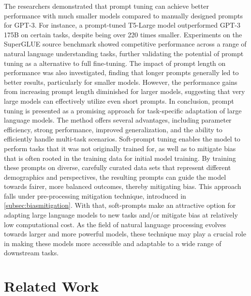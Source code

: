 The researchers demonstrated that prompt tuning can achieve better performance with much smaller models compared to manually designed prompts for GPT-3. For instance, a prompt-tuned T5-Large model outperformed GPT-3 175B on certain tasks, despite being over 220 times smaller. Experiments on the SuperGLUE \textcolor{bhtRed}{source} benchmark showed competitive performance across a range of natural language understanding tasks, further validating the potential of prompt tuning as a alternative to full fine-tuning. The impact of prompt length on performance was also investigated, finding that longer prompts generally led to better results, particularly for smaller models. However, the performance gains from increasing prompt length diminished for larger models, suggesting that very large models can effectively utilize even short prompts. 
In conclusion, prompt tuning is presented as a promising approach for task-specific adaptation of large language models. The method offers several advantages, including parameter efficiency, strong performance, improved generalization, and the ability to efficiently handle multi-task scenarios.  Soft-prompt tuning enables the model to perform tasks that it was not originally trained for, as well as to mitigate bias that is often rooted in the training data for initial model training. By training these prompts on diverse, carefully curated data sets that represent different demographics and perspectives, the resulting prompts can guide the model towards fairer, more balanced outcomes, thereby mitigating bias. This approach falls under pre-processing mitigation technique, introduced in \autoref{subsec:biasmitigation}. With that, soft-prompts make an attractive option for adapting large language models to new tasks and/or mitigate bias at relatively low computational cost. As the field of natural language processing evolves towards larger and more powerful models, these technique may play a crucial role in making these models more accessible and adaptable to a wide range of downstream tasks.



\section{Related Work}
